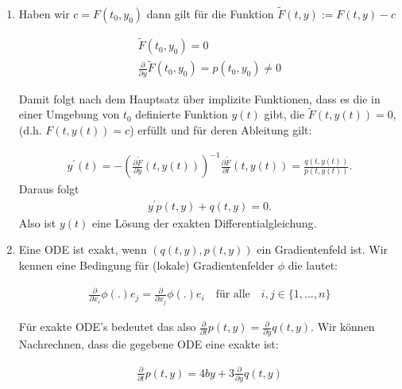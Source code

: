 \begin{solution}
  \phantom{}
\leavevmode \\
\begin{enumerate}[label = \textbf{\alph*)}]
\item
Haben wir $c = F(t_0 , y_0 )$ dann gilt für die Funktion $\widetilde{F}(t,y) := F(t,y) - c$

\begin{align*}
  \widetilde{F}(t_0 , y_0 ) = 0 \\
  \frac{\partial}{\partial y}\widetilde{F}(t_0 , y_0 ) = p(t_0 , y_0 ) \neq 0
\end{align*}

Damit folgt nach dem Hauptsatz über implizite
Funktionen, dass es die in einer Umgebung von $t_0$ definierte Funktion $y(t)$ gibt, die
$\widetilde{F}(t,y(t)) = 0$, (d.h. $F(t,y(t))=c$) erfüllt und für
deren Ableitung gilt:

\begin{align*}
  y^{\prime}(t) = -\left(\frac{\partial \widetilde{F}}{\partial y}(t,y(t))\right)^{-1}
  \frac{\partial \widetilde{F}}{\partial t}(t,y(t)) = \frac{q(t,y(t))}{p(t,y(t))}.
\end{align*}
Daraus folgt
\begin{align*}
  y^{\prime}p(t,y) + q(t,y) = 0.
\end{align*}
Also ist $y(t)$ eine Lösung der exakten Differentialgleichung.
\item
Eine ODE ist exakt, wenn $(q(t,y), p(t,y))$ ein Gradientenfeld ist. Wir kennen eine
Bedingung für (lokale) Gradientenfelder $\phi$ die lautet:

\begin{align*}
  \frac{\partial}{\partial x_i} \phi(.) e_j = \frac{\partial}{\partial x_j} \phi(.) e_i
  \quad \text{für alle} \quad i, j \in \{1,...,n\}
\end{align*}

Für exakte ODE's bedeutet  das also $\frac{\partial}{\partial t} p(t,y) =
\frac{\partial}{\partial y} q(t,y)$.
Wir können Nachrechnen, dass die gegebene ODE eine exakte ist:

\begin{align*}
  \frac{\partial}{\partial t} p(t,y) = 4by + 3
  \frac{\partial}{\partial y} q(t,y)
\end{align*}


\end{enumerate}
\end{solution}
